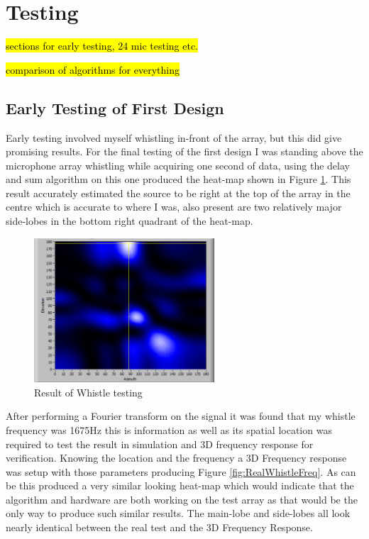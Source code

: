 \documentclass{UoNMCHA}
\numberwithin{equation}{section}
\begin{document}
\newpage
\section{Testing} \label{sec:Lab Testing}
    \hl{sections for early testing, 24 mic testing etc.}
    
    \hl{comparison of algorithms for everything}
\subsection{Early Testing of First Design} \label{sec:First Array Testing}
    Early testing  involved myself whistling in-front of the array, but this did give promising results. For the final testing of the first design I was standing above the microphone array whistling while acquiring one second of data, using the delay and sum algorithm on this one produced the heat-map shown in Figure \ref{fig:RealWhistle}. This result accurately estimated the source to be right at the top of the array in the centre which is accurate to where I was, also present are two relatively major side-lobes in the bottom right quadrant of the heat-map.
    
    \begin{figure} [H]
        \centering
        \includegraphics[keepaspectratio, width = 0.6\textwidth]{Figures/RealWhistle.png}
        \caption{Result of Whistle testing}
        \label{fig:RealWhistle}
    \end{figure}
    
    After performing a Fourier transform on the signal it was found that my whistle frequency was 1675Hz this is information as well as its spatial location was required to test the result in simulation and 3D frequency response for verification. Knowing the location and the frequency a 3D Frequency response was setup with those parameters producing Figure \ref{fig:RealWhistleFreq}. As can be this produced a very similar looking heat-map which would indicate that the algorithm and hardware are both working on the test array as that would be the only way to produce such similar results. The main-lobe and side-lobes all look nearly identical between the real test and the 3D Frequency Response.
    
\end{document}
